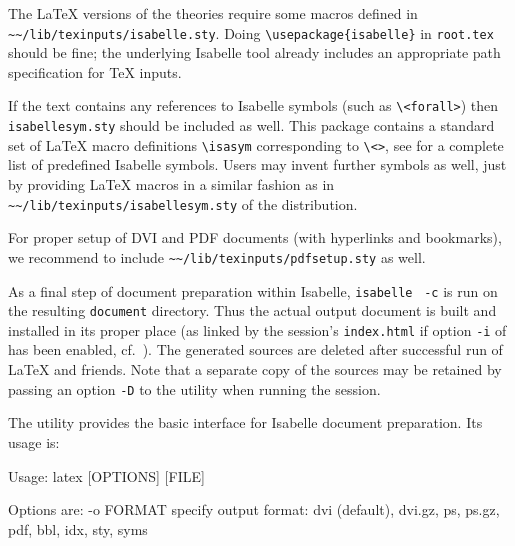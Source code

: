\begin{isabellebody}
\begin{isamarkuptext}
  The {\LaTeX} versions of the theories require some macros defined in
  \verb|~~/lib/texinputs/isabelle.sty|.  Doing \verb|\usepackage{isabelle}| in \verb|root.tex| should be fine;
  the underlying Isabelle \hyperlink{tool.latex}{\mbox{}} tool already includes an
  appropriate path specification for {\TeX} inputs.

  If the text contains any references to Isabelle symbols (such as
  \verb|\|\verb|<forall>|) then \verb|isabellesym.sty| should be included as well.  This package
  contains a standard set of {\LaTeX} macro definitions \verb|\isasym| corresponding to \verb|\|\verb|<|\verb|>|, see \cite{isabelle-implementation} for a
  complete list of predefined Isabelle symbols.  Users may invent
  further symbols as well, just by providing {\LaTeX} macros in a
  similar fashion as in \verb|~~/lib/texinputs/isabellesym.sty| of
  the distribution.

  For proper setup of DVI and PDF documents (with hyperlinks and
  bookmarks), we recommend to include \verb|~~/lib/texinputs/pdfsetup.sty| as well.

  \medskip As a final step of document preparation within Isabelle,
  \verb|isabelle| \hyperlink{tool.document}{\mbox{}}~\verb|-c| is run on the
  resulting \verb|document| directory.  Thus the actual output
  document is built and installed in its proper place (as linked by
  the session's \verb|index.html| if option \verb|-i| of
  \hyperlink{tool.usedir}{\mbox{}} has been enabled, cf.\ ).  The
  generated sources are deleted after successful run of {\LaTeX} and
  friends.  Note that a separate copy of the sources may be retained
  by passing an option \verb|-D| to the \hyperlink{tool.usedir}{\mbox{}} utility
  when running the session.%
\end{isamarkuptext}%
\isamarkuptrue%
%
\isamarkuptrue%
%
\begin{isamarkuptext}%
The \hypertarget{tool.latex}{\hyperlink{tool.latex}{\mbox{}}} utility provides the basic interface for
  Isabelle document preparation.  Its usage is:
\begin{ttbox}
Usage: latex [OPTIONS] [FILE]

  Options are:
    -o FORMAT    specify output format: dvi (default), dvi.gz, ps,
                 ps.gz, pdf, bbl, idx, sty, syms


\end{ttbox}
\end{isamarkuptext}
\end{isabellebody}
